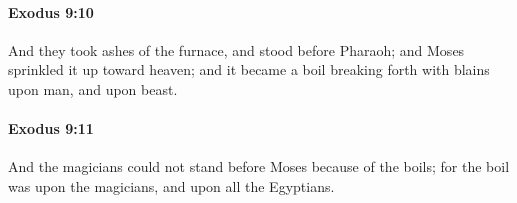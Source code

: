		\paragraph{Exodus 9:10} %
			\label{EXODUS-9-10}

			And they took ashes of the furnace, and stood before Pharaoh; and Moses sprinkled it up toward heaven; and it became a boil breaking forth with blains upon man, and upon beast.


		\paragraph{Exodus 9:11} %
			\label{EXODUS-9-11}

			And the magicians could not stand before Moses because of the boils; for the boil was upon the magicians, and upon all the Egyptians.


